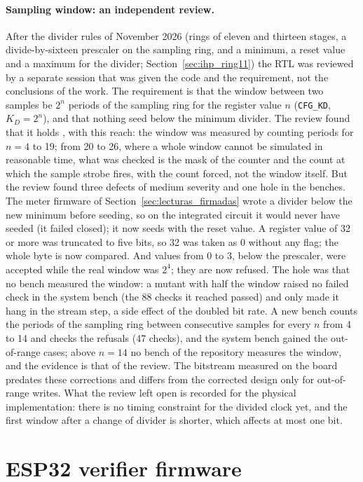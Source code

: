 \paragraph{Sampling window: an independent review.} After the divider
rules of November 2026 (rings of eleven and thirteen stages, a
divide-by-sixteen prescaler on the sampling ring, and a minimum, a reset
value and a maximum for the divider; Section~\ref{sec:ihp_ring11}) the
\ac{RTL} was reviewed by a separate session that was given the code and
the requirement, not the conclusions of the work. The requirement is
that the window between two samples be $2^{n}$ periods of the sampling
ring for the register value $n$ (\texttt{CFG\_KD}, $K_D = 2^{n}$), and
that nothing seed below the minimum divider. The review found that it
holds \simu{}, with this reach: the window was measured by counting
periods for $n = 4$ to 19; from 20 to 26, where a whole window cannot be
simulated in reasonable time, what was checked is the mask of the
counter and the count at which the sample strobe fires, with the count
forced, not the window itself. But the
review found three defects of medium severity and one hole in the
benches. The meter firmware of Section~\ref{sec:lecturas_firmadas} wrote
a divider below the new minimum before seeding, so on the integrated
circuit it would never have seeded (it failed closed); it now seeds with
the reset value. A register value of 32 or more was truncated to five
bits, so 32 was taken as 0 without any flag; the whole byte is now
compared. And values from 0 to 3, below the prescaler, were accepted
while the real window was $2^{4}$; they are now refused. The hole was
that no bench measured the window: a mutant with half the window raised
no failed check in the system bench (the 88 checks it reached passed)
and only made it hang in the stream step, a side effect of the doubled
bit rate. A new bench counts the periods of the sampling ring
between consecutive samples for every $n$ from 4 to 14 and checks the
refusals (47 checks), and the system bench gained the out-of-range
cases; above $n = 14$ no bench of the repository measures the window,
and the evidence is that of the review. The bitstream measured on the board predates these corrections
and differs from the corrected design only for out-of-range writes. What
the review left open is recorded for the physical implementation: there
is no timing constraint for the divided clock yet, and the first window
after a change of divider is shorter, which affects at most one bit.

\section{ESP32 verifier firmware}
\label{sec:firmware}

